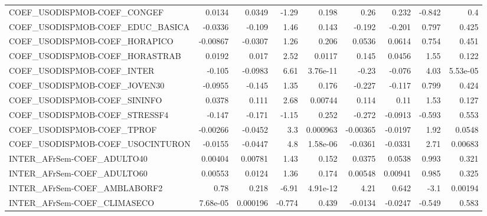 \begin{tabular}{lrrrrrrrr}
COEF\_USODISPMOB-COEF\_CONGEF           &      0.0134 &       0.0349 &    -1.29 &    0.198 &       0.26 &       0.232 &       -0.842 &           0.4 \\
COEF\_USODISPMOB-COEF\_EDUC\_BASICA      &     -0.0336 &       -0.109 &     1.46 &    0.143 &     -0.192 &      -0.201 &        0.797 &         0.425 \\
COEF\_USODISPMOB-COEF\_HORAPICO         &    -0.00867 &      -0.0307 &     1.26 &    0.206 &     0.0536 &      0.0614 &        0.754 &         0.451 \\
COEF\_USODISPMOB-COEF\_HORASTRAB        &      0.0192 &        0.017 &     2.52 &   0.0117 &      0.145 &      0.0456 &         1.55 &         0.122 \\
COEF\_USODISPMOB-COEF\_INTER            &      -0.105 &      -0.0983 &     6.61 & 3.76e-11 &      -0.23 &      -0.076 &         4.03 &      5.53e-05 \\
COEF\_USODISPMOB-COEF\_JOVEN30          &     -0.0955 &       -0.145 &     1.35 &    0.176 &     -0.227 &      -0.117 &        0.799 &         0.424 \\
COEF\_USODISPMOB-COEF\_SININFO          &      0.0378 &        0.111 &     2.68 &  0.00744 &      0.114 &        0.11 &         1.53 &         0.127 \\
COEF\_USODISPMOB-COEF\_STRESSF4         &      -0.147 &       -0.171 &    -1.15 &    0.252 &     -0.272 &     -0.0913 &       -0.593 &         0.553 \\
COEF\_USODISPMOB-COEF\_TPROF            &    -0.00266 &      -0.0452 &      3.3 & 0.000963 &   -0.00365 &     -0.0197 &         1.92 &        0.0548 \\
COEF\_USODISPMOB-COEF\_USOCINTURON      &     -0.0155 &      -0.0447 &      4.8 & 1.58e-06 &    -0.0361 &     -0.0331 &         2.71 &       0.00683 \\
INTER\_AFrSem-COEF\_ADULTO40            &     0.00404 &      0.00781 &     1.43 &    0.152 &     0.0375 &      0.0538 &        0.993 &         0.321 \\
INTER\_AFrSem-COEF\_ADULTO60            &     0.00553 &       0.0124 &     1.36 &    0.174 &    0.00548 &     0.00941 &        0.985 &         0.325 \\
INTER\_AFrSem-COEF\_AMBLABORF2          &        0.78 &        0.218 &    -6.91 & 4.91e-12 &       4.21 &       0.642 &         -3.1 &       0.00194 \\
INTER\_AFrSem-COEF\_CLIMASECO           &    7.68e-05 &     0.000196 &   -0.774 &    0.439 &    -0.0134 &     -0.0247 &       -0.549 &         0.583 \\

\end{tabular}
